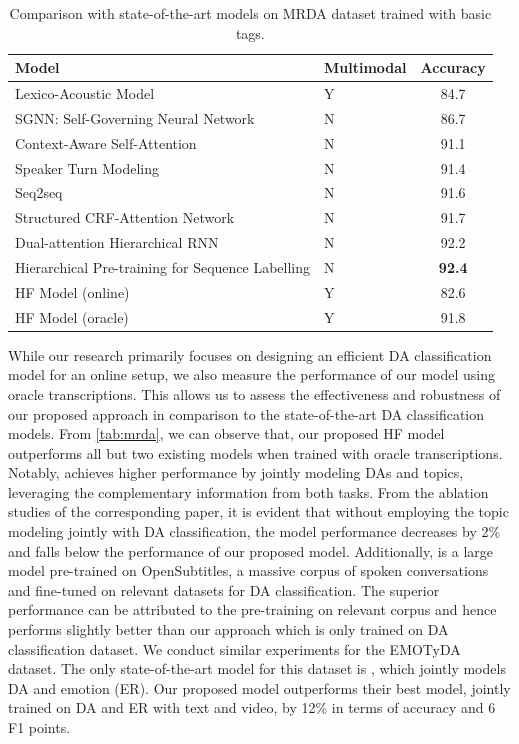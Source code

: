 \begin{table}
  \centering
  \small
  \begin{tabularx}{\linewidth}{Xlc}
    \toprule
    Model & Multimodal & Accuracy \\
    \midrule
    Lexico-Acoustic Model \cite{lexico} & Y & 84.7 \\
    SGNN: Self-Governing Neural Network \cite{ravi-kozareva-2018-self-governing} & N & 86.7 \\
    Context-Aware Self-Attention \cite{raheja-tetreault-2019-dialogue} & N & 91.1 \\
    Speaker Turn Modeling  \cite{he-etal-2021-speaker-turn} & N & 91.4 \\
    Seq2seq \cite{DBLP:journals/corr/abs-2002-08801} & N & 91.6 \\
    Structured CRF-Attention Network \cite{10.1145/3209978.3209997} & N & 91.7 \\
    Dual-attention Hierarchical RNN \cite{li-etal-2019-dual} & N & 92.2 \\
    Hierarchical Pre-training for Sequence Labelling \cite{chapuis2021hierarchical} & N & \textbf{92.4} \\
    \hline
    HF Model (online) & Y & 82.6 \\
    HF Model (oracle) & Y & 91.8 \\
    \bottomrule
  \end{tabularx}
  \caption{Comparison with state-of-the-art models on MRDA dataset trained with basic tags.}
  \label{tab:mrda}
\end{table}

While our research primarily focuses on designing an efficient DA classification model for an online setup, we also measure the performance of our model using oracle transcriptions. This allows us to assess the effectiveness and robustness of our proposed approach in comparison to the state-of-the-art DA classification models. From \autoref{tab:mrda}, we can observe that, our proposed HF model outperforms all but two existing models when trained with oracle transcriptions. Notably, \cite{li-etal-2019-dual} achieves higher performance by jointly modeling DAs and topics, leveraging the complementary information from both tasks. From the ablation studies of the corresponding paper, it is evident that without employing the topic modeling jointly with DA classification, the model performance decreases by 2\% and falls below the performance of our proposed model. Additionally, \cite{chapuis2021hierarchical} is a large model pre-trained on OpenSubtitles, a massive corpus of spoken conversations and fine-tuned on relevant datasets for DA classification. The superior performance can be attributed to the pre-training on relevant corpus and hence performs slightly better than our approach which is only trained on DA classification dataset. We conduct similar experiments for the EMOTyDA dataset. The only state-of-the-art model for this dataset is \cite{saha-etal-2020-towards}, which jointly models DA and emotion (ER). Our proposed model outperforms their best model, jointly trained on DA and ER with text and video, by 12\% in terms of accuracy and 6 F1 points.

